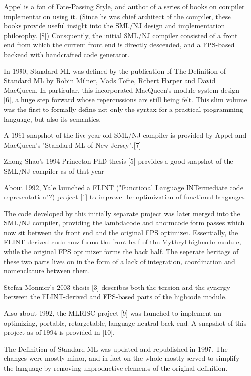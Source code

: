 Appel is a fan of Fate-Passing Style, and author 
of a series of books on compiler implementation using it. 
(Since he was chief architect of the compiler, these books 
provide useful insight into the SML/NJ design and 
implementation philosophy. [8])  Consquently, the initial 
SML/NJ compiler consisted of a front end from which the 
current front end is directly descended, and a FPS-based 
backend with handcrafted code generator.

In 1990, Standard ML was defined by the publication of The 
Definition of Standard ML by Robin Milner, Mads Tofte, 
Robert Harper and David MacQueen.  In particular, this 
incorporated MacQueen's module system design [6], a huge step 
forward whose repercussions are still being felt.  This 
slim volume was the first to formally define not only the 
syntax for a practical programming language, but also its 
semantics.

A 1991 snapshot of the five-year-old SML/NJ compiler is 
provided by Appel and MacQueen's "Standard ML of New Jersey".[7]

Zhong Shao's 1994 Princeton PhD thesis [5] provides a good 
snapshot of the SML/NJ compiler as of that year.

About 1992, Yale launched a FLINT ("Functional Language 
INTermediate code representation"?) project [1] to improve 
the optimization of functional languages.

The code developed by this initially separate project was 
later merged into the SML/NJ compiler, providing the 
lambdacode and anormcode form passes which now sit between 
the front end and the original FPS optimizer.  Essentially, 
the FLINT-derived code now forms the front half of the 
Mythryl highcode module, while the original FPS optimizer 
forms the back half.  The seperate heritage of these two 
parts lives on in the form of a lack of integration, 
coordination and nomenclature between them.

Stefan Monnier's 2003 thesis [3] describes both the tension 
and the synergy between the FLINT-derived and FPS-based 
parts of the highcode module.

Also about 1992, the MLRISC project [9] was launched 
to implement an optimizing, portable, retargetable, 
language-neutral back end.  A snapshot of this project 
as of 1994 is provided in [10].

The Definition of Standard ML was updated and republished 
in 1997.  The changes were mostly minor, and in fact on 
the whole mostly served to simplify the language by removing 
unproductive elements of the original definition.

